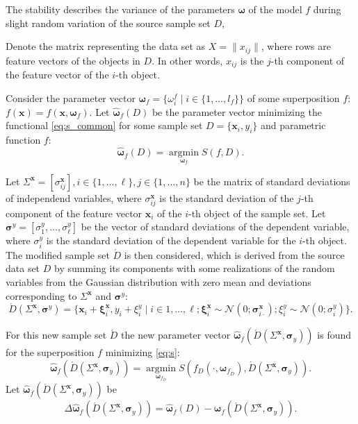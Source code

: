 \documentclass[11pt,a4paper]{article}
\theoremstyle{definition}
\begin{document}
The stability describes the variance of the parameters $\boldsymbol{\omega}$ of the model $f$
during slight random variation of the source sample set $D$,

Denote the matrix representing the data set as $X = \| x_{ij} \|$, where
rows are feature vectors of the objects in $D$. In other words, $x_{ij}$
is the $j$-th component of the feature vector of the $i$-th object.

Consider the parameter vector
$\boldsymbol{\omega}_f = \{ \omega_i^f \mid i \in \{ 1, \dots, l_f \} \}$
of some superposition $f$: $f(\mathbf{x}) = f(\mathbf{x}, \boldsymbol{\omega}_f)$.
Let $\hat{\boldsymbol{\omega}}_f(D)$ be the parameter vector minimizing the
functional \eqref{eq:s_common} for some sample set $D = \{ \mathbf{x}_i, y_i \}$ and
parametric function $f$:
\[
  \hat{\boldsymbol{\omega}}_f(D) = \mathop{\arg \min}\limits_{\boldsymbol{\omega}_f} S(f, D).
\]

Let
$\Sigma^{\mathbf{x}} = [ \sigma^{\mathbf{x}}_{ij} ], i \in \{ 1, \dots, \ell \}, j \in \{ 1, \dots, n \}$
be the matrix of
standard deviations of independend variables, where $\sigma^{\mathbf{x}}_{ij}$
is the standard deviation of the $j$-th component of the feature vector
$\mathbf{x}_i$ of the $i$-th object of the sample set. Let
$\boldsymbol{\sigma}^y = [ \sigma^y_1, \dots, \sigma^y_\ell ]$
be the vector of standard deviations of the dependent variable, where $\sigma^y_i$
is the standard deviation of the dependent variable for the $i$-th object.
The modified sample set $\acute{D}$ is then considered, which is derived from the
source data set $D$ by summing its components with some realizations of the
random variables from the Gaussian distribution with zero mean and 
deviations corresponding to $\Sigma^{\mathbf{x}}$ and $\boldsymbol{\sigma}^y$:
\begin{equation}
  \acute{D}(\Sigma^{\mathbf{x}}, \boldsymbol{\sigma}^y) = \{ \mathbf{x}_i + \boldsymbol{\xi}^{\mathbf{x}}_i, y_i + \xi^y_i \mid i \in 1, \dots, \ell; \boldsymbol{\xi}^{\mathbf{x}}_i \sim \mathcal{N}(0; \boldsymbol{\sigma}^{\mathbf{x}}_{i \cdot}); \xi^y_i \sim \mathcal{N}(0; \sigma^y_i) \}.
  \label{eq:d_acute}
\end{equation}

For this new sample set $\acute{D}$ the new parameter vector $\hat{\boldsymbol{\omega}}_f (\acute{D} (\Sigma^{\mathbf{x}}, \boldsymbol{\sigma}_y))$
is found for the superposition $f$ minimizing \eqref{eq:s}:
\begin{equation}
  \hat{\boldsymbol{\omega}}_f (\acute{D} (\Sigma^{\mathbf{x}}, \boldsymbol{\sigma}_y)) = \mathop{\arg \min}\limits_{\boldsymbol{\omega}_{f_D}} S (f_D (\cdot, \boldsymbol{\omega}_{f_D}), \acute{D} (\Sigma^{\mathbf{x}}, \boldsymbol{\sigma}_y)).
  \label{eq:hat_omega}
\end{equation}
Let $\hat{\boldsymbol{\omega}}_f (\acute{D} (\Sigma^{\mathbf{x}}, \boldsymbol{\sigma}_y))$ be
\[
  \Delta\hat{\boldsymbol{\omega}}_f(\acute{D} (\Sigma^{\mathbf{x}}, \boldsymbol{\sigma}_y) ) = \hat{\boldsymbol{\omega}}_f(D) - \hat{\boldsymbol{\omega}}_f (\acute{D} (\Sigma^{\mathbf{x}}, \boldsymbol{\sigma}_y)).
\]
\end{document}
